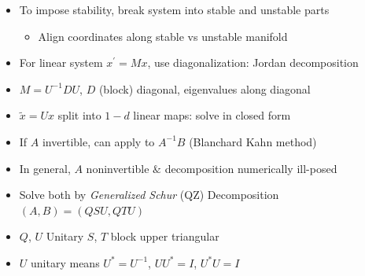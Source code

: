 \documentclass[bigger,handout]{beamer}
\begin{document}
\begin{frame}%
 

\begin{itemize}
\item To impose stability, break system into stable and unstable parts
\begin{itemize}
\item Align coordinates along stable vs unstable manifold
\end{itemize}
\item For linear system $x^{\prime}=Mx$, use diagonalization: Jordan decomposition
\item $M=U^{-1}DU$, $D$ (block) diagonal, eigenvalues along diagonal 
\item $\tilde{x}=Ux$ split into $1-d$ linear maps: solve in closed form
\item If $A$ invertible, can apply to $A^{-1}B$ (Blanchard Kahn method)
\item In general, $A$ noninvertible $\&$ decomposition numerically ill-posed
\item Solve both by \emph{Generalized Schur} (QZ) Decomposition $\left(A,B\right)=\left(QSU,QTU\right)$
\item $Q$, $U$ Unitary  $S$, $T$ block upper triangular
\item $U$ unitary means $U^{*}=U^{-1}$, $UU^{*}=I$, $U^{*}U=I$


\end{itemize}

\end{frame}%
\end{document}
